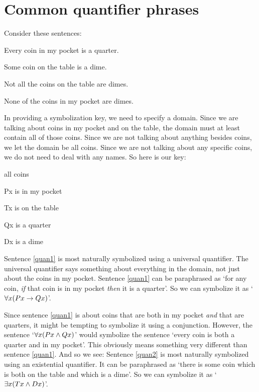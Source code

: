 \section{Common quantifier phrases}
Consider these sentences:
	\begin{earg}
		\item[\ex{quan1}] Every coin in my pocket is a quarter.
		\item[\ex{quan2}] Some coin on the table is a dime.
		\item[\ex{quan3}] Not all the coins on the table are dimes.
		\item[\ex{quan4}] None of the coins in my pocket are dimes.
	\end{earg}
In providing a symbolization key, we need to specify a domain. Since we are talking about coins in my pocket and on the table, the domain must at least contain all of those coins. Since we are not talking about anything besides coins, we let the domain be all coins. Since we are not talking about any specific coins, we do not need to deal with any names. So here is our key:
	\begin{ekey}
		\item[\text{domain}] all coins
		\item[Px]  is in my pocket
		\item[Tx]  is on the table
		\item[Qx]  is a quarter
		\item[Dx]  is a dime
	\end{ekey}
Sentence \ref{quan1} is most naturally symbolized using a universal quantifier. The universal quantifier says something about everything in the domain, not just about the coins in my pocket. Sentence \ref{quan1} can be paraphrased as `for any coin, \emph{if} that coin is in my pocket \emph{then} it is a quarter'. So we can symbolize it as `$\forall x(Px \rightarrow Qx)$'.

Since sentence \ref{quan1} is about coins that are both in my pocket \emph{and} that are quarters, it might be tempting to symbolize it using a conjunction. However, the sentence `$\forall x(Px \wedge Qx)$' would symbolize the sentence `every coin is both a quarter and in my pocket'. This obviously means something very different than sentence \ref{quan1}. And so we see:
Sentence \ref{quan2} is most naturally symbolized using an existential quantifier. It can be paraphrased as `there is some coin which is both on the table and which is a dime'. So we can symbolize it as `$\exists x(Tx \wedge Dx)$'.

